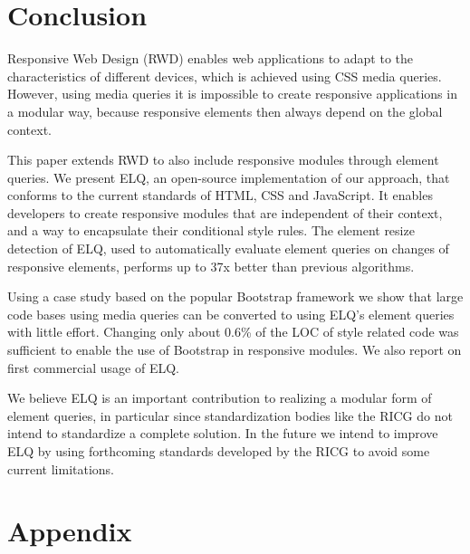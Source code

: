 \documentclass[]{llncs}
\newcommand{\elq}{ELQ}
\newcommand{\comment}[1]{}
\begin{document}
\section{Conclusion}\label{sec:conclusion}
  Responsive Web Design (RWD) enables web applications to adapt to the characteristics of different devices, which is achieved using CSS media queries.
  However, using media queries it is impossible to create responsive applications in a modular way, because responsive elements then always depend on the global context.

  This paper extends RWD to also include responsive modules through element queries.
  We present \elq{}, an open-source implementation of our approach, that conforms to the current standards of HTML, CSS and JavaScript.
  It enables developers to create responsive modules that are independent of their context, and a way to encapsulate their conditional style rules.
  The element resize detection of \elq{}, used to automatically evaluate element queries on changes of responsive elements, performs up to 37x better than previous algorithms.

  Using a case study based on the popular Bootstrap framework we show that large code bases using media queries can be converted to using \elq{}'s element queries with little effort.
  Changing only about 0.6\% of the LOC of style related code was sufficient to enable the use of Bootstrap in responsive modules.
  We also report on first commercial usage of \elq{}.

  We believe \elq{} is an important contribution to realizing a modular form of element queries, in particular since standardization bodies like the RICG do not intend to standardize a complete solution.
  In the future we intend to improve \elq{} by using forthcoming standards developed by the RICG to avoid some current limitations.


\comment{
\subsubsection*{Acknowledgments.}
The authors would like to thank EVRY for sponsoring the \elq{} project including the supporting projects for element resize detection and batch processing.
}



\newpage
\appendix
\section{Appendix}
\end{document}
